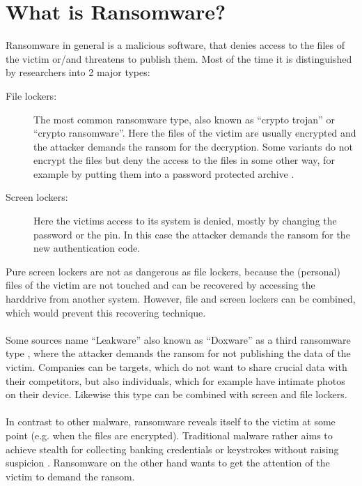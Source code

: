 \section{What is Ransomware?}

Ransomware in general is a malicious software, that denies access to the files of the victim or/and threatens to publish them. Most of the time it is distinguished by researchers into 2 major types:

\begin{description}
\item[File lockers:] The most common ransomware type, also known as ``crypto trojan'' or ``crypto ransomware''. Here the files of the victim are usually encrypted and the attacker demands the ransom for the decryption. Some variants do not encrypt the files but deny the access to the files in some other way, for example by putting them into a password protected archive \cite{Symantec2017a}.
  
\item[Screen lockers:] Here the victims access to its system is denied, mostly by changing the password or the pin. In this case the attacker demands the ransom for the new authentication code.
\end{description}

Pure screen lockers are not as dangerous as file lockers, because the (personal) files of the victim are not touched and can be recovered by accessing the harddrive from another system. However, file and screen lockers can be combined, which would prevent this recovering technique.\\
\\
Some sources name ``Leakware'' also known as ``Doxware'' as a third ransomware type \cite{Upadhaya2017}, where the attacker demands the ransom for not publishing the data of the victim. Companies can be targets, which do not want to share crucial data with their competitors, but also individuals, which for example have intimate photos on their device. Likewise this type can be combined with screen and file lockers.\\
\\
In contrast to other malware, ransomware reveals itself to the victim at some point (e.g. when the files are encrypted). Traditional malware rather aims to achieve stealth for collecting banking credentials or keystrokes without raising suspicion \cite{Kirda2017}. Ransomware on the other hand wants to get the attention of the victim to demand the ransom.
